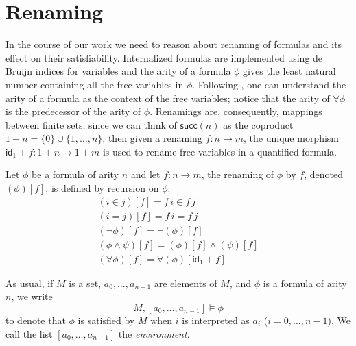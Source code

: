 \section{Renaming}
\label{sec:renaming}
\newcommand{\renaming}[2]{(#1)[#2]}
\newcommand{\inFm}[2]{#1 \in #2}
\newcommand{\eqFm}[2]{#1 = #2}
\newcommand{\negFm}[1]{\neg #1}
\newcommand{\andFm}[2]{#1 \wedge #2}
\newcommand{\forallFm}[1]{\forall #1}

\newcommand{\inIFm}[2]{\mathsf{Member}(#1,#2)}
\newcommand{\eqIFm}[2]{\mathsf{Equal}(#1,#2)}
\newcommand{\nandIFm}[2]{\mathsf{Nand}(#1,#2)}
\newcommand{\forallIFm}[1]{\mathsf{Forall(#1)}}


In the course of our work we need to reason about renaming of formulas
and its effect on their satisfiability. Internalized formulas are
implemented using de Bruijn indices for variables and the arity of a
formula $\phi$ gives the least natural number containing all the free
variables in $\phi$. Following \citet{fiore-abssyn}, one can
understand the arity of a formula as the context of the free
variables; notice that the arity of $\forallFm{\phi}$ is the
predecessor of the arity of $\phi$. Renamings are, consequently,
mappings between finite sets; since we can think of $\mathsf{succ}(n)$
as the coproduct $1+n = \{0\} \cup \{1,\dots,n\}$, then given a
renaming $f \colon n \to m$, the 
unique morphism $\mathsf{id}_1+f \colon 1+n \to 1+m$ is used to rename
free variables in a quantified formula. 

\begin{definition}[Renaming]
  Let $\phi$ be a formula of arity $n$ and let $f \colon n \to m$, the
  renaming of $\phi$ by $f$, denoted $\renaming{\phi}{f}$, is defined
  by recursion on $\phi$:
  \begin{gather*}
    \renaming{\inFm{i}{j}}{f} = \inFm{f\,i}{f\,j}\\
    \renaming{\eqFm{i}{j}}{f} = \eqFm{f\,i}{f\,j}\\
    \renaming{\negFm{\phi}}{f} = \negFm{\renaming{\phi}{f}}\\
    \renaming{\andFm{\phi}{\psi}}{f} = \andFm{\renaming{\phi}{f}}{\renaming{\psi}{f}}\\
    \renaming{\forallFm{\phi}}{f} = \forallFm{\renaming{\phi}{\mathsf{id}_1+f}}
  \end{gather*}
\end{definition}

As usual, if $M$ is a set, $a_0,\dots,a_{n-1}$ are elements of $M$, and
$\phi$ is a formula of arity $n$, we write
\[
M,[a_0,\dots,a_{n-1}] \models \phi
\]
to denote that $\phi$ is satisfied by $M$ when $i$ is interpreted
as $a_i$ ($i=0,\dots,n-1$). We call the list $[a_0,\dots,a_{n-1}]$ the
\emph{environment}.

